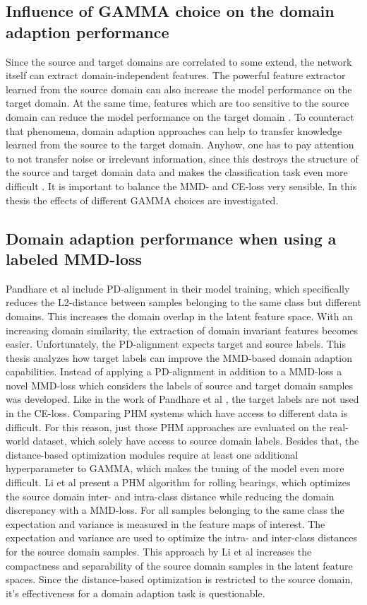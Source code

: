 \subsection{Influence of GAMMA choice on the domain adaption performance}
Since the source and target domains are correlated to some extend, the network itself can extract domain-independent features. The powerful feature extractor learned from the source domain can also increase the model performance on the target domain. At the same time, features which are too sensitive to the source domain can reduce the model performance on the target domain \cite{li2020}. To counteract that phenomena, domain adaption approaches can help to transfer knowledge learned from the source to the target domain. Anyhow, one has to pay attention to not transfer noise or irrelevant information, since this destroys the structure of the source and target domain data and makes the classification task even more difficult \cite{li2020}. It is important to balance the MMD- and CE-loss very sensible. In this thesis the effects of different GAMMA choices are investigated.

\subsection{Domain adaption performance when using a labeled MMD-loss}
Pandhare et al \cite{Pandhare2021} include PD-alignment in their model training, which specifically reduces the L2-distance between samples belonging to the same class but different domains. This increases the domain overlap in the latent feature space. With an increasing domain similarity, the extraction of domain invariant features becomes easier. Unfortunately, the PD-alignment expects target and source labels. This thesis analyzes how target labels can improve the MMD-based domain adaption capabilities. Instead of applying a PD-alignment in addition to a MMD-loss a novel MMD-loss which considers the labels of source and target domain samples was developed. Like in the work of Pandhare et al \cite{Pandhare2021}, the target labels are not used in the CE-loss. Comparing PHM systems which have access to different data is difficult. For this reason, just those PHM approaches are evaluated on the real-world dataset, which solely have access to source domain labels.  Besides that, the distance-based optimization modules require at least one additional hyperparameter to GAMMA, which makes the tuning of the model even more difficult. Li et al \cite{Li2018} present a PHM algorithm for rolling bearings, which optimizes the source domain inter- and intra-class distance while reducing the domain discrepancy with a MMD-loss. For all samples belonging to the same class the expectation and variance is measured in the feature maps of interest. The expectation and variance are used to optimize the intra- and inter-class distances for the source domain samples. This approach by Li et al increases the compactness and separability of the source domain samples in the latent feature spaces. Since the distance-based optimization is restricted to the source domain, it's effectiveness for a domain adaption task is questionable.

